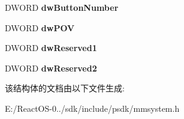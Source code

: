 \begin{DoxyCompactItemize}
D\+W\+O\+RD {\bfseries dw\+Button\+Number}
\item 
\mbox{\label{structjoyinfoex__tag_a5e579233fbb2e383cb837099c36de86a}} 
D\+W\+O\+RD {\bfseries dw\+P\+OV}
\item 
\mbox{\label{structjoyinfoex__tag_a4a2607a838218be324a9f11d8a671632}} 
D\+W\+O\+RD {\bfseries dw\+Reserved1}
\item 
\mbox{\label{structjoyinfoex__tag_aba803b626dafd4646545a9518b417254}} 
D\+W\+O\+RD {\bfseries dw\+Reserved2}
\end{DoxyCompactItemize}


该结构体的文档由以下文件生成\+:\begin{DoxyCompactItemize}
\item 
E\+:/\+React\+O\+S-\/0../sdk/include/psdk/mmsystem.\+h\end{DoxyCompactItemize}
